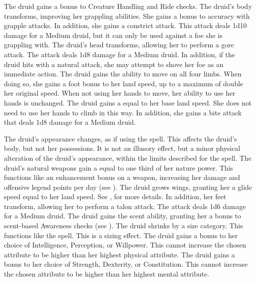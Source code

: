         The druid gains a  bonus to Creature Handling and Ride checks.
        The druid's body transforms, improving her grappling abilities.
        She gains a  bonus to accuracy with grapple attacks.
        In addition, she gains a constrict attack.
        This attack deals 1d10 damage for a Medium druid, but it can only be used against a foe she is grappling with.
        The druid's head transforms, allowing her to perform a gore attack.
        The attack deals 1d8 damage for a Medium druid.
        In addition, if the druid hits with a natural attack, she may attempt to shove her foe as an immediate action.
        The druid gains the ability to move on all four limbs.
        When doing so, she gains a  foot bonus to her land speed, up to a maximum of double her original speed.
        When not using her hands to move, her ability to use her hands is unchanged.
        The druid gains a  equal to her base land speed.
        She does not need to use her hands to climb in this way.
        In addition, she gains a bite attack that deals 1d8 damage for a Medium druid.

        The druid's appearance changes, as if using the  spell.
        This affects the druid's body, but not her possessions.
        It is not an illusory effect, but a minor physical alteration of the druid's appearance, within the limits described for the spell.
        The druid's natural weapons gain a  equal to one third of her nature power.
        This functions like an enhancement bonus on a weapon, increasing her damage and offensive legend points per day (see ).
        The druid grows wings, granting her a glide speed equal to her land speed.
        See , for more details.
        In addition, her feet transform, allowing her to perform a talon attack.
        The attack deals 1d6 damage for a Medium druid.
        The druid gains the scent ability, granting her a  bonus to scent-based Awareness checks (see ).
        The druid shrinks by a size category.
        This functions like the  spell.
        This is a sizing effect.
        The druid gains a  bonus to her choice of Intelligence, Perception, or Willpower.
        This cannot increase the chosen attribute to be higher than her highest physical attribute.
        The druid gains a  bonus to her choice of Strength, Dexterity, or Constitution.
        This cannot increase the chosen attribute to be higher than her highest mental attribute.

